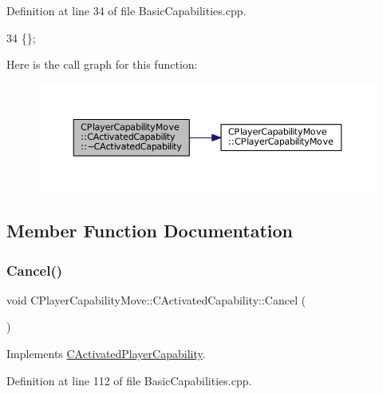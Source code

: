 Definition at line 34 of file Basic\+Capabilities.\+cpp.


\begin{DoxyCode}
34 \{\};
\end{DoxyCode}
Here is the call graph for this function\+:
\nopagebreak
\begin{figure}[H]
\begin{center}
\leavevmode
\includegraphics[width=350pt]{classCPlayerCapabilityMove_1_1CActivatedCapability_a32285a6970ff939ebafc8ab9dd84317b_cgraph}
\end{center}
\end{figure}


\subsection{Member Function Documentation}
\hypertarget{classCPlayerCapabilityMove_1_1CActivatedCapability_a6fe1e26646bd14e94ebf7abd0a41cdd3}{}\label{classCPlayerCapabilityMove_1_1CActivatedCapability_a6fe1e26646bd14e94ebf7abd0a41cdd3} 
\subsubsection{\texorpdfstring{Cancel()}{Cancel()}}
{\footnotesize\ttfamily void C\+Player\+Capability\+Move\+::\+C\+Activated\+Capability\+::\+Cancel (\begin{DoxyParamCaption}{ }\end{DoxyParamCaption})\hspace{0.3cm}{\ttfamily [virtual]}}



Implements \hyperlink{classCActivatedPlayerCapability_a5cde83be468e262ad054d81e28684a81}{C\+Activated\+Player\+Capability}.



Definition at line 112 of file Basic\+Capabilities.\+cpp.


